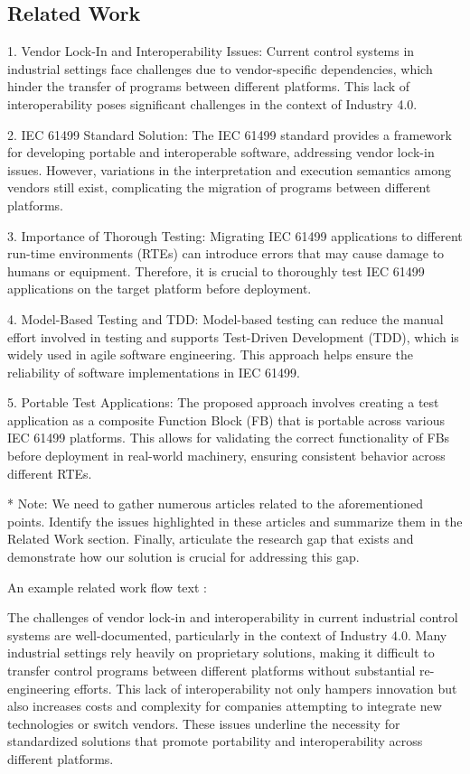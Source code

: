 \subsection{Related Work}


1. Vendor Lock-In and Interoperability Issues: Current control systems in industrial settings face challenges due to vendor-specific dependencies, which hinder the transfer of programs between different platforms. This lack of interoperability poses significant challenges in the context of Industry 4.0.

2. IEC 61499 Standard Solution: The IEC 61499 standard provides a framework for developing portable and interoperable software, addressing vendor lock-in issues. However, variations in the interpretation and execution semantics among vendors still exist, complicating the migration of programs between different platforms.

3. Importance of Thorough Testing: Migrating IEC 61499 applications to different run-time environments (RTEs) can introduce errors that may cause damage to humans or equipment. Therefore, it is crucial to thoroughly test IEC 61499 applications on the target platform before deployment.

4. Model-Based Testing and TDD: Model-based testing can reduce the manual effort involved in testing and supports Test-Driven Development (TDD), which is widely used in agile software engineering. This approach helps ensure the reliability of software implementations in IEC 61499.

5. Portable Test Applications: The proposed approach involves creating a test application as a composite Function Block (FB) that is portable across various IEC 61499 platforms. This allows for validating the correct functionality of FBs before deployment in real-world machinery, ensuring consistent behavior across different RTEs.

* Note: We need to gather numerous articles related to the aforementioned points. Identify the issues highlighted in these articles and summarize them in the Related Work section. Finally, articulate the research gap that exists and demonstrate how our solution is crucial for addressing this gap.

An example related work flow text : 


The challenges of vendor lock-in and interoperability in current industrial control systems are well-documented, particularly in the context of Industry 4.0. Many industrial settings rely heavily on proprietary solutions, making it difficult to transfer control programs between different platforms without substantial re-engineering efforts. This lack of interoperability not only hampers innovation but also increases costs and complexity for companies attempting to integrate new technologies or switch vendors. These issues underline the necessity for standardized solutions that promote portability and interoperability across different platforms.

